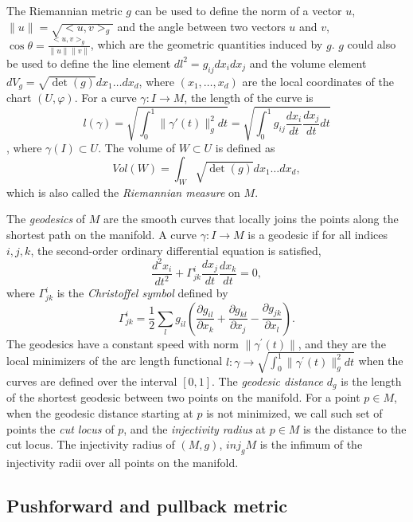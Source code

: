 \documentclass[11pt,a4paper,]{article}
\begin{document}
The Riemannian metric \(g\) can be used to define the norm of a vector \(u\), \(\|u\| = \sqrt{<u,v>_g}\) and the angle between two vectors \(u\) and \(v\), \(\cos\theta = \frac{<u,v>_g}{\|u\| \|v\|}\), which are the geometric quantities induced by \(g\).
\(g\) could also be used to define the line element \(dl^2 = g_{ij}dx_idx_j\) and the volume element \(dV_g = \sqrt{\det(g)}dx_1\dots dx_d\), where \((x_1,\dots,x_d)\) are the local coordinates of the chart \((U, \varphi)\).
For a curve \(\gamma: I \rightarrow M\), the length of the curve is
\[l(\gamma) = \sqrt{\int_0^1 \|\gamma\prime(t)\|^2_g dt} = \sqrt{\int_0^1 g_{ij} \frac{dx_i}{dt} \frac{dx_j}{dt} dt}\],
where \(\gamma(I) \subset U\). The volume of \(W \subset U\) is defined as
\[
Vol(W) = \int_W \sqrt{\det(g)}dx_1 \dots dx_d,
\]
which is also called the \emph{Riemannian measure} on \(M\).

The \emph{geodesics} of \(M\) are the smooth curves that locally joins the points along the shortest path on the manifold. A curve \(\gamma: I \rightarrow M\) is a geodesic if for all indices \(i,j,k\),
the second-order ordinary differential equation is satisfied,
\[
\frac{d^2 x_i}{dt^2} + \Gamma^i_{jk} \frac{d x_j}{dt} \frac{dx_k}{dt} = 0,
\]
where \(\Gamma^i_{jk}\) is the \emph{Christoffel symbol} defined by
\[
\Gamma^i_{jk} = \frac{1}{2} \sum_l g_{il} (\frac{\partial g_{il}}{\partial x_k} 
+ \frac{\partial g_{kl}}{\partial x_j} - \frac{\partial g_{jk}}{\partial x_l}).
\]
The geodesics have a constant speed with norm \(\| \gamma^\prime(t) \|\), and they are the local minimizers of the arc length functional \(l:\gamma \rightarrow \sqrt{\int_0^1 \| \gamma^\prime(t) \|_g^2 dt}\) when the curves are defined over the interval \([0,1]\). The \emph{geodesic distance} \(d_g\) is the length of the shortest geodesic between two points on the manifold.
For a point \(p \in M\), when the geodesic distance starting at \(p\) is not minimized, we call such set of points the \emph{cut locus} of \(p\), and the \emph{injectivity radius} at \(p \in M\) is the distance to the cut locus. The injectivity radius of \((M,g)\), \(\textit{inj}_gM\) is the infimum of the injectivity radii over all points on the manifold.

\hypertarget{pushforward-and-pullback-metric}{%
\subsection{Pushforward and pullback metric}\label{pushforward-and-pullback-metric}}
\end{document}
